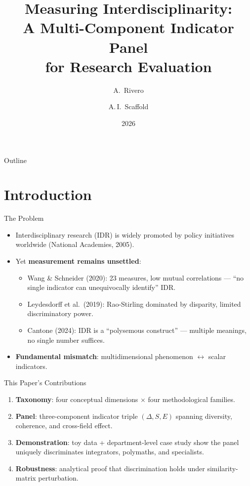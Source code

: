 \documentclass[aspectratio=169,10pt]{beamer}
\title{Measuring Interdisciplinarity:\\
  A Multi-Component Indicator Panel\\
  for Research Evaluation}
\author{A.~Rivero \and A.\,I.~Scaffold}
\date{2026}
\institute{}
\begin{document}
\begin{frame}
\titlepage
\end{frame}

\begin{frame}{Outline}
\tableofcontents
\end{frame}

\section{Introduction}

\begin{frame}{The Problem}
\begin{itemize}
  \item Interdisciplinary research (IDR) is widely promoted by policy
        initiatives worldwide (National Academies, 2005).
  \item Yet \textbf{measurement remains unsettled}:
  \begin{itemize}
    \item Wang \& Schneider (2020): 23 measures, low mutual correlations
          --- ``no single indicator can unequivocally identify'' IDR.
    \item Leydesdorff et al.\ (2019): Rao-Stirling dominated by disparity,
          limited discriminatory power.
    \item Cantone (2024): IDR is a ``polysemous construct'' ---
          multiple meanings, no single number suffices.
  \end{itemize}
  \item \textbf{Fundamental mismatch}: multidimensional phenomenon
        $\longleftrightarrow$ scalar indicators.
\end{itemize}
\end{frame}

\begin{frame}{This Paper's Contributions}
\begin{enumerate}
  \item \textbf{Taxonomy}: four conceptual dimensions
        $\times$ four methodological families.
  \item \textbf{Panel}: three-component indicator triple $(\Delta, S, E)$
        spanning diversity, coherence, and cross-field effect.
  \item \textbf{Demonstration}: toy data + department-level case study
        show the panel uniquely discriminates integrators, polymaths,
        and specialists.
  \item \textbf{Robustness}: analytical proof that discrimination holds
        under similarity-matrix perturbation.
\end{enumerate}
\end{frame}
\end{document}
